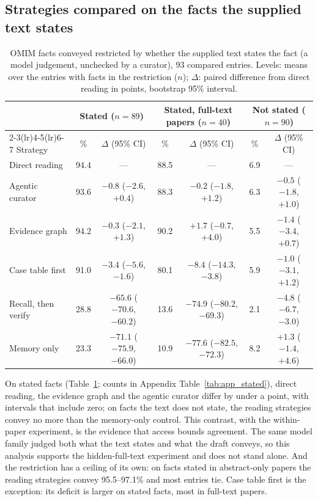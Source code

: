 \documentclass{article} %
\begin{document}
\subsection{Strategies compared on the facts the supplied text states}
\label{sec:stated}
\begin{table}[t]
\caption{OMIM facts conveyed restricted by whether the supplied text states the fact (a model judgement, unchecked by a curator), 93 compared entries. Levels: means over the entries with facts in the restriction ($n$); $\Delta$: paired difference from direct reading in points, bootstrap 95\% interval.}
\label{tab:stated}
\begin{center}
\footnotesize
\setlength{\tabcolsep}{2.6pt}
\begin{tabular}{lcccccc}
\toprule
 & \multicolumn{2}{c}{Stated ($n=89$)} & \multicolumn{2}{c}{Stated, full-text papers ($n=40$)} & \multicolumn{2}{c}{Not stated ($n=90$)} \\
\cmidrule(lr){2-3}\cmidrule(lr){4-5}\cmidrule(lr){6-7}
Strategy & \% & $\Delta$ (95\% CI) & \% & $\Delta$ (95\% CI) & \% & $\Delta$ (95\% CI) \\
\midrule
Direct reading & 94.4 & --- & 88.5 & --- & 6.9 & --- \\
Agentic curator & 93.6 & $-0.8$ ($-2.6$, $+0.4$) & 88.3 & $-0.2$ ($-1.8$, $+1.2$) & 6.3 & $-0.5$ ($-1.8$, $+1.0$) \\
Evidence graph & 94.2 & $-0.3$ ($-2.1$, $+1.3$) & 90.2 & $+1.7$ ($-0.7$, $+4.0$) & 5.5 & $-1.4$ ($-3.4$, $+0.7$) \\
Case table first & 91.0 & $-3.4$ ($-5.6$, $-1.6$) & 80.1 & $-8.4$ ($-14.3$, $-3.8$) & 5.9 & $-1.0$ ($-3.1$, $+1.2$) \\
Recall, then verify & 28.8 & $-65.6$ ($-70.6$, $-60.2$) & 13.6 & $-74.9$ ($-80.2$, $-69.3$) & 2.1 & $-4.8$ ($-6.7$, $-3.0$) \\
Memory only & 23.3 & $-71.1$ ($-75.9$, $-66.0$) & 10.9 & $-77.6$ ($-82.5$, $-72.3$) & 8.2 & $+1.3$ ($-1.4$, $+4.6$) \\
\bottomrule
\end{tabular}
\end{center}
\end{table}
On stated facts (Table~\ref{tab:stated}; counts in Appendix Table~\ref{tab:app_stated}), direct reading, the evidence graph and the agentic curator differ by under a point, with intervals that include zero; on facts the text does not state, the reading strategies convey no more than the memory-only control. This contrast, with the within-paper experiment, is the evidence that access bounds agreement. The same model family judged both what the text states and what the draft conveys, so this analysis supports the hidden-full-text experiment and does not stand alone. And the restriction has a ceiling of its own: on facts stated in abstract-only papers the reading strategies convey 95.5--97.1\% and most entries tie. Case table first is the exception: its deficit is larger on stated facts, most in full-text papers.
\end{document}
